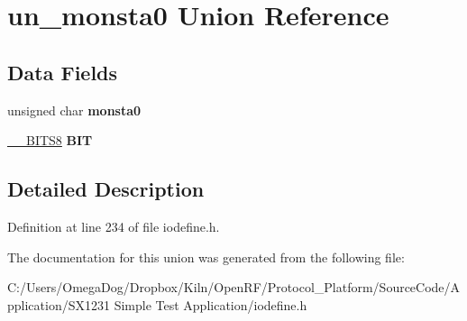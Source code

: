 \hypertarget{unionun__monsta0}{\section{un\-\_\-monsta0 Union Reference}
\label{unionun__monsta0}
}
\subsection*{Data Fields}
\begin{DoxyCompactItemize}
\item 
\hypertarget{unionun__monsta0_ada3fc3ae23be6246fbc017795a78df77}{unsigned char {\bfseries monsta0}}\label{unionun__monsta0_ada3fc3ae23be6246fbc017795a78df77}

\item 
\hypertarget{unionun__monsta0_ab13018995b9acfc1a34b1666fbf7251b}{\hyperlink{struct_____b_i_t_s8}{\-\_\-\-\_\-\-B\-I\-T\-S8} {\bfseries B\-I\-T}}\label{unionun__monsta0_ab13018995b9acfc1a34b1666fbf7251b}

\end{DoxyCompactItemize}


\subsection{Detailed Description}


Definition at line 234 of file iodefine.\-h.



The documentation for this union was generated from the following file\-:\begin{DoxyCompactItemize}
\item 
C\-:/\-Users/\-Omega\-Dog/\-Dropbox/\-Kiln/\-Open\-R\-F/\-Protocol\-\_\-\-Platform/\-Source\-Code/\-Application/\-S\-X1231 Simple Test Application/iodefine.\-h\end{DoxyCompactItemize}
